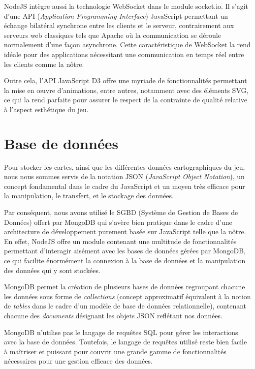 \documentclass[12pt]{report}
\begin{document}
	NodeJS intègre aussi la technologie WebSocket dans le module socket.io. Il s'agit d'une API (\textit{Application Programming Interface}) JavaScript permettant un échange bilatéral synchrone entre les clients et le serveur, contrairement aux serveurs web classiques tels que Apache où la communication se déroule normalement d'une façon asynchrone. Cette caractéristique de WebSocket la rend idéale pour des applications nécessitant une communication en temps réel entre les clients comme la nôtre.

	Outre cela, l'API JavaScript D3 offre une myriade de fonctionnalités permettant la mise en \oe{}uvre d'animations, entre autres, notamment avec des éléments SVG, ce qui la rend parfaite pour assurer le respect de la contrainte de qualité relative à l'aspect esthétique du jeu.

  \section{Base de données}
	Pour stocker les cartes, ainsi que les différentes données cartographiques du jeu, nous nous sommes servis de la notation JSON (\textit{JavaScript Object Notation}), un concept fondamental dans le cadre du JavaScript et un moyen très efficace pour la manipulation, le transfert, et le stockage des données.

	Par conséquent, nous avons utilisé le SGBD (Système de Gestion de Bases de Données) offert par MongoDB qui s'avère bien pratique dans le cadre d'une architecture de développement purement basée sur JavaScript telle que la nôtre. En effet, NodeJS offre un module contenant une multitude de fonctionnalités permettant d'interagir aisément avec les bases de données gérées par MongoDB, ce qui facilite énormément la connexion à la base de données et la manipulation des données qui y sont stockées.

	MongoDB permet la création de plusieurs bases de données regroupant chacune les données sous forme de \textit{collections} (concept approximatif équivalent à la notion de \textit{tables} dans le cadre d'un modèle de base de données relationnelle), contenant chacune des \textit{documents} désignant les objets JSON reflétant nos données.

	MongoDB n'utilise pas le langage de requêtes SQL pour gérer les interactions avec la base de données. Toutefois, le langage de requêtes utilisé reste bien facile à maîtriser et puissant pour couvrir une grande gamme de fonctionnalités nécessaires pour une gestion efficace des données.
\end{document}
